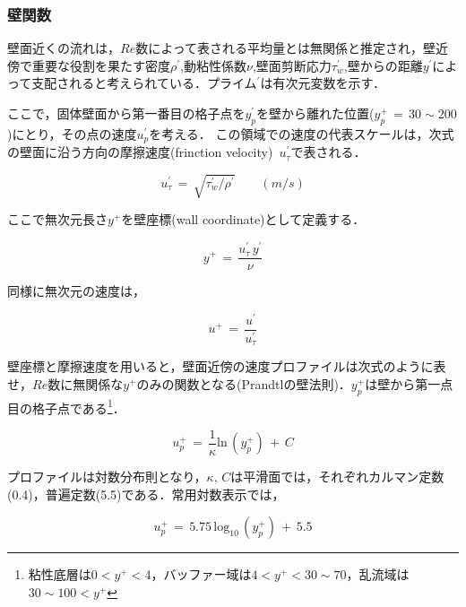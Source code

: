 %
\subsubsection{壁関数}
壁面近くの流れは，$Re$数によって表される平均量とは無関係と推定され，壁近傍で重要な役割を果たす密度$\rho^{\prime}$,動粘性係数$\nu$,壁面剪断応力$\tau_w^{\prime}$,壁からの距離$y^{\prime}$によって支配されると考えられている．プライム${}^{\prime}$は有次元変数を示す．

ここで，固体壁面から第一番目の格子点を$y_p^{\prime}$を壁から離れた位置($y^+_p\,=\,30\sim200$)にとり，その点の速度$u_p^{\prime}$を考える．
この領域での速度の代表スケールは，次式の壁面に沿う方向の摩擦速度(frinction velocity)~$u_{\tau}^{\prime}$で表される．

\begin{equation}
u_{\tau}^{\prime} \,=\, \sqrt{\tau_w^{\prime}/\rho^{\prime}} \qquad (m/s)
\label{eq:friction velocity}
\end{equation}

\noindent ここで無次元長さ$y^+$を壁座標(wall coordinate)として定義する．

\begin{equation}
y^+ \,=\, \frac{u_{\tau}^{\prime} \, y^{\prime}}{\nu}
\label{eq:wall coordinate}
\end{equation}

\noindent 同様に無次元の速度は，

\begin{equation}
u^+ \,=\, \frac{u^{\prime}}{u_{\tau}^{\prime}}
\label{eq:non dim vel on wall}
\end{equation}

\noindent 壁座標と摩擦速度を用いると，壁面近傍の速度プロファイルは次式のように表せ，$Re$数に無関係な$y^+$のみの関数となる(Prandtlの壁法則)．$y^+_p$は壁から第一点目の格子点である\footnote{粘性底層は$0<y^+<4$，バッファー域は$4<y^+<30\sim70$，乱流域は$30\sim100<y^+$}．

\begin{equation}
u^+_p \,=\, \frac{1}{\kappa}\mathrm{ln}\,(y^+_p)\,+\,C
\label{eq:log-law log_e}
\end{equation}

\noindent プロファイルは対数分布則となり，$\kappa,\,C$は平滑面では，それぞれカルマン定数(0.4)，普遍定数(5.5)である．常用対数表示では，

\begin{equation}
u^+_p \,=\, 5.75 \, \mathrm{log_{10}}\,(y_p^+)\,+\,5.5
\label{eq:log-law log_10}
\end{equation}

